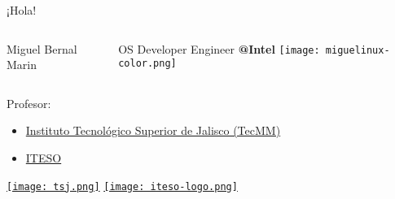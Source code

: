 
\begin{frame}[c]{¡Hola!}

  \begin{columns}
      Miguel Bernal Marin

      \vspace{\baselineskip}
      OS Developer Engineer \textbf{@Intel}
      \texttt{[image: miguelinux-color.png]}
  \end{columns}

  Profesor:
  \begin{itemize}
    \item \href{http://tecmm.edu.mx/}{Instituto Tecnológico Superior
      de Jalisco (TecMM)}
    \item \href{https://iteso.mx/}{ITESO}
  \end{itemize}

  \begin{center}
    \href{http://tecmm.edu.mx/}{\texttt{[image: tsj.png]}}
    \hspace{1cm}
    \href{https://iteso.mx/}{\texttt{[image: iteso-logo.png]}}
  \end{center}
\end{frame}
